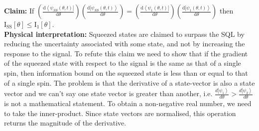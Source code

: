 \documentclass[reqno]{amsart}
\newcommand{\ket}[1]{\left| #1 \right>}
\newcommand{\bra}[1]{\left< #1 \right|}
\def\funcwrt#1#2#3{\mathrm{#1}_{\mathrm{#3}}\left[#2\right]}
\begin{document}
\textbf{Claim:} If $\left(\frac{\mathrm{d}\bra{\psi_{SS}(\theta,t)}}{\mathrm{d} \theta}\right)\left(\frac{\mathrm{d}\ket{\psi_{SS}(\theta,t)}}{\mathrm{d} \theta}\right) = \left(\frac{\mathrm{d}\bra{\psi_1(\theta,t)}}{\mathrm{d} \theta}\right)\left(\frac{\mathrm{d}\ket{\psi_1(\theta,t)}}{\mathrm{d} \theta}\right)$ then $\funcwrt{I}{\theta}{SS} \leq \funcwrt{I}{\theta}{1}$.\\

\textbf{Physical interpretation:} Squeezed states are claimed to surpass the SQL by reducing the uncertainty associated with some state, and not by increasing the response to the signal. To refute this claim we need to show that if the gradient of the squeezed state with respect to the signal is the same as that of a single spin, then information bound on the squeezed state is less than or equal to that of a single spin. The problem is that the derivative of a state-vector is also a state vector and we can't say one state vector is greater than another, i.e. $\frac{d\ket{\psi_1}}{d\theta} > \frac{d\ket{\psi_2}}{d\theta}$ is not a mathematical statement. To obtain a non-negative real number, we need to take the inner-product. Since state vectors are normalised, this operation returns the magnitude of the derivative.\\
\end{document}
